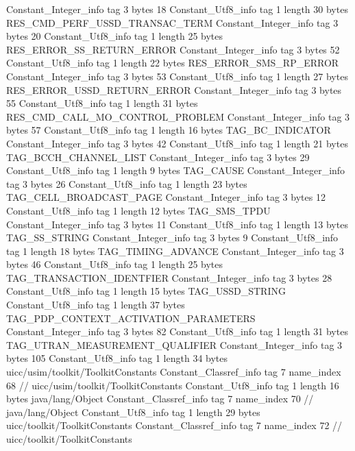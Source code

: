 {{{		}
		Constant_Integer_info {
			tag	3
			bytes	18
		}
		Constant_Utf8_info {
			tag	1
			length	30
			bytes	RES_CMD_PERF_USSD_TRANSAC_TERM
		}
		Constant_Integer_info {
			tag	3
			bytes	20
		}
		Constant_Utf8_info {
			tag	1
			length	25
			bytes	RES_ERROR_SS_RETURN_ERROR
		}
		Constant_Integer_info {
			tag	3
			bytes	52
		}
		Constant_Utf8_info {
			tag	1
			length	22
			bytes	RES_ERROR_SMS_RP_ERROR
		}
		Constant_Integer_info {
			tag	3
			bytes	53
		}
		Constant_Utf8_info {
			tag	1
			length	27
			bytes	RES_ERROR_USSD_RETURN_ERROR
		}
		Constant_Integer_info {
			tag	3
			bytes	55
		}
		Constant_Utf8_info {
			tag	1
			length	31
			bytes	RES_CMD_CALL_MO_CONTROL_PROBLEM
		}
		Constant_Integer_info {
			tag	3
			bytes	57
		}
		Constant_Utf8_info {
			tag	1
			length	16
			bytes	TAG_BC_INDICATOR
		}
		Constant_Integer_info {
			tag	3
			bytes	42
		}
		Constant_Utf8_info {
			tag	1
			length	21
			bytes	TAG_BCCH_CHANNEL_LIST
		}
		Constant_Integer_info {
			tag	3
			bytes	29
		}
		Constant_Utf8_info {
			tag	1
			length	9
			bytes	TAG_CAUSE
		}
		Constant_Integer_info {
			tag	3
			bytes	26
		}
		Constant_Utf8_info {
			tag	1
			length	23
			bytes	TAG_CELL_BROADCAST_PAGE
		}
		Constant_Integer_info {
			tag	3
			bytes	12
		}
		Constant_Utf8_info {
			tag	1
			length	12
			bytes	TAG_SMS_TPDU
		}
		Constant_Integer_info {
			tag	3
			bytes	11
		}
		Constant_Utf8_info {
			tag	1
			length	13
			bytes	TAG_SS_STRING
		}
		Constant_Integer_info {
			tag	3
			bytes	9
		}
		Constant_Utf8_info {
			tag	1
			length	18
			bytes	TAG_TIMING_ADVANCE
		}
		Constant_Integer_info {
			tag	3
			bytes	46
		}
		Constant_Utf8_info {
			tag	1
			length	25
			bytes	TAG_TRANSACTION_IDENTFIER
		}
		Constant_Integer_info {
			tag	3
			bytes	28
		}
		Constant_Utf8_info {
			tag	1
			length	15
			bytes	TAG_USSD_STRING
		}
		Constant_Utf8_info {
			tag	1
			length	37
			bytes	TAG_PDP_CONTEXT_ACTIVATION_PARAMETERS
		}
		Constant_Integer_info {
			tag	3
			bytes	82
		}
		Constant_Utf8_info {
			tag	1
			length	31
			bytes	TAG_UTRAN_MEASUREMENT_QUALIFIER
		}
		Constant_Integer_info {
			tag	3
			bytes	105
		}
		Constant_Utf8_info {
			tag	1
			length	34
			bytes	uicc/usim/toolkit/ToolkitConstants
		}
		Constant_Classref_info {
			tag	7
			name_index	68		// uicc/usim/toolkit/ToolkitConstants
		}
		Constant_Utf8_info {
			tag	1
			length	16
			bytes	java/lang/Object
		}
		Constant_Classref_info {
			tag	7
			name_index	70		// java/lang/Object
		}
		Constant_Utf8_info {
			tag	1
			length	29
			bytes	uicc/toolkit/ToolkitConstants
		}
		Constant_Classref_info {
			tag	7
			name_index	72		// uicc/toolkit/ToolkitConstants
}}}
